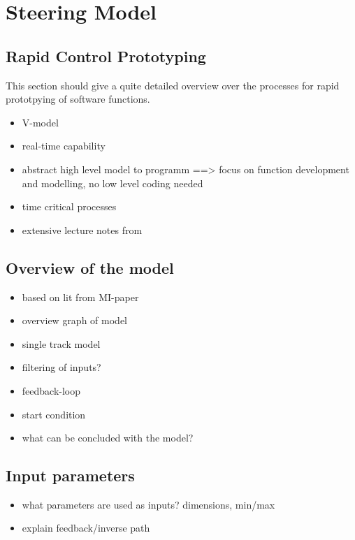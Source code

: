 \documentclass[ExampleMasters.tex]{subfiles}
\begin{document}
\clearpage
\chapter{Steering Model}
\label{chap:steering_model}

\section{Rapid Control Prototyping}
\label{sec:rapid_proto}

This section should give a quite detailed overview over the processes for rapid prototpying of software functions.
\begin{itemize}
	\item V-model
	\item real-time capability
	\item abstract high level model to programm ==> focus on function development and modelling, no low level coding needed
	\item time critical processes
	\item extensive lecture notes from \cite{rapidcontrolprototyping}
\end{itemize}

\section{Overview of the model}
\label{sec:overview_of_the_model}
			
\begin{itemize}
	\item based on lit from MI-paper 
	\item overview graph of model
	\item single track model
	
	\item filtering of inputs?
	\item feedback-loop
	\item start condition
	\item what can be concluded with the model?
\end{itemize}

\section{Input parameters}
\label{sec:input_parameters}

\begin{itemize}
	\item what parameters are used as inputs? dimensions, min/max
	\item explain feedback/inverse path
	
\end{itemize}
\end{document}
